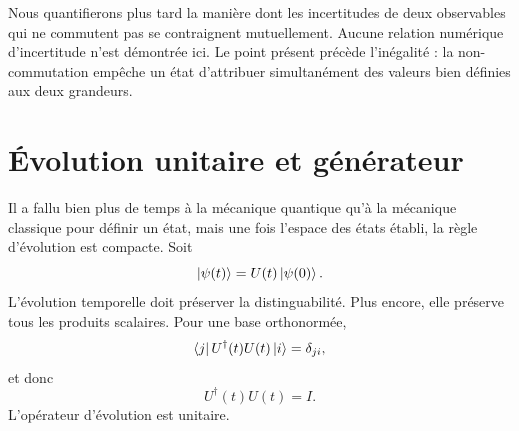 Nous quantifierons plus tard la manière dont les incertitudes de deux observables qui ne commutent pas se contraignent mutuellement. Aucune relation numérique d’incertitude n’est démontrée ici. Le point présent précède l’inégalité : la non-commutation empêche un état d’attribuer simultanément des valeurs bien définies aux deux grandeurs.

\begin{classroomqa}\end{classroomqa}

\begin{classroomqa}\end{classroomqa}

\section{Évolution unitaire et générateur}

Il a fallu bien plus de temps à la mécanique quantique qu’à la mécanique classique pour définir un état, mais une fois l’espace des états établi, la règle d’évolution est compacte. Soit
\begin{equation}
\left\lvert\psi(t)\right\rangle=U(t)\left\lvert\psi(0)\right\rangle.
\label{eq:l5-propagator}
\end{equation}
L’évolution temporelle doit préserver la distinguabilité. Plus encore, elle préserve tous les produits scalaires. Pour une base orthonormée,
\begin{equation}
\left\langle j\right\rvert U^\dagger(t)U(t)\left\lvert i\right\rangle=\delta_{ji},
\end{equation}
et donc
\begin{equation}
U^\dagger(t)U(t)=I.
\label{eq:l5-unitarity}
\end{equation}
L’opérateur d’évolution est unitaire.

